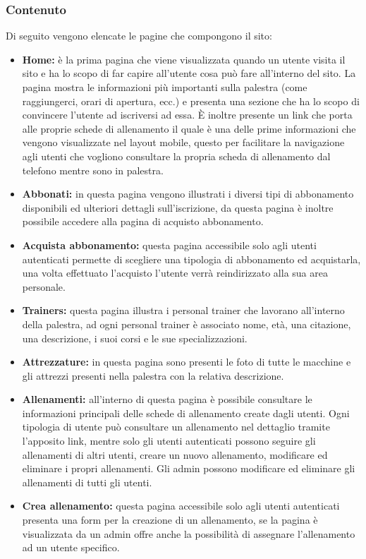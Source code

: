 \documentclass[a4paper]{article}
\begin{document}
	\subsubsection{Contenuto} \label{contenuto}
	Di seguito vengono elencate le pagine che compongono il sito:
	\begin{itemize}
		\item \textbf{Home:} è la prima pagina che viene visualizzata quando un utente visita il sito e ha lo scopo di far capire all'utente cosa può fare all'interno del sito. La pagina mostra le informazioni più importanti sulla palestra (come raggiungerci, orari di apertura, ecc.) e presenta una sezione che ha lo scopo di convincere l'utente ad iscriversi ad essa. È inoltre presente un link che porta alle proprie schede di allenamento il quale è una delle prime informazioni che vengono visualizzate nel layout mobile, questo per facilitare la navigazione agli utenti che vogliono consultare la propria scheda di allenamento dal telefono mentre sono in palestra.
		\item \textbf{Abbonati:} in questa pagina vengono illustrati i diversi tipi di abbonamento disponibili ed ulteriori dettagli sull'iscrizione, da questa pagina è inoltre possibile accedere alla pagina di acquisto abbonamento.
		\item \textbf{Acquista abbonamento:} questa pagina accessibile solo agli utenti autenticati permette di scegliere una tipologia di abbonamento ed acquistarla, una volta effettuato l'acquisto l'utente verrà reindirizzato alla sua area personale.
		\item \textbf{Trainers:} questa pagina illustra i personal trainer che lavorano all'interno della palestra, ad ogni personal trainer è associato nome, età, una citazione, una descrizione, i suoi corsi e le sue specializzazioni.
		\item \textbf{Attrezzature:} in questa pagina sono presenti le foto di tutte le macchine e gli attrezzi presenti nella palestra con la relativa descrizione.
		\item \textbf{Allenamenti:} all'interno di questa pagina è possibile consultare le informazioni principali delle schede di allenamento create dagli utenti. Ogni tipologia di utente può consultare un allenamento nel dettaglio tramite l'apposito link, mentre solo gli utenti autenticati possono seguire gli allenamenti di altri utenti, creare un nuovo allenamento, modificare ed eliminare i propri allenamenti. Gli admin possono modificare ed eliminare gli allenamenti di tutti gli utenti.
		\item \textbf{Crea allenamento:} questa pagina accessibile solo agli utenti autenticati presenta una form per la creazione di un allenamento, se la pagina è visualizzata da un admin offre anche la possibilità di assegnare l'allenamento ad un utente specifico.

\end{itemize}
\end{document}
